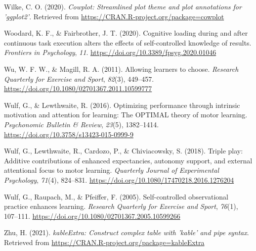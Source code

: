 \documentclass[
  english,
  doc, donotrepeattitle,floatsintext]{apa7}
\newlength{\cslhangindent}
\newlength{\cslentryspacingunit} %
\newenvironment{CSLReferences}[2] %
 {%
  \setlength{\parindent}{0pt}
  \ifodd #1
  \let\oldpar\par
  \def\par{\hangindent=\cslhangindent\oldpar}
  \fi
  \setlength{\parskip}{#2\cslentryspacingunit}
 }%
 {}
\begin{document}
\begin{CSLReferences}{1}{0}
\leavevmode{}%
Wilke, C. O. (2020). \emph{Cowplot: Streamlined plot theme and plot annotations for 'ggplot2'}. Retrieved from \url{https://CRAN.R-project.org/package=cowplot}

\leavevmode{}%
Woodard, K. F., \& Fairbrother, J. T. (2020). Cognitive loading during and after continuous task execution alters the effects of self-controlled knowledge of results. \emph{Frontiers in Psychology}, \emph{11}. \url{https://doi.org/10.3389/fpsyg.2020.01046}

\leavevmode{}%
Wu, W. F. W., \& Magill, R. A. (2011). Allowing learners to choose. \emph{Research Quarterly for Exercise and Sport}, \emph{82}(3), 449--457. \url{https://doi.org/10.1080/02701367.2011.10599777}

\leavevmode{}%
Wulf, G., \& Lewthwaite, R. (2016). Optimizing performance through intrinsic motivation and attention for learning: The OPTIMAL theory of motor learning. \emph{Psychonomic Bulletin \& Review}, \emph{23}(5), 1382--1414. \url{https://doi.org/10.3758/s13423-015-0999-9}

\leavevmode{}%
Wulf, G., Lewthwaite, R., Cardozo, P., \& Chiviacowsky, S. (2018). Triple play: Additive contributions of enhanced expectancies, autonomy support, and external attentional focus to motor learning. \emph{Quarterly Journal of Experimental Psychology}, \emph{71}(4), 824--831. \url{https://doi.org/10.1080/17470218.2016.1276204}

\leavevmode{}%
Wulf, G., Raupach, M., \& Pfeiffer, F. (2005). Self-controlled observational practice enhances learning. \emph{Research Quarterly for Exercise and Sport}, \emph{76}(1), 107--111. \url{https://doi.org/10.1080/02701367.2005.10599266}

\leavevmode{}%
Zhu, H. (2021). \emph{kableExtra: Construct complex table with 'kable' and pipe syntax}. Retrieved from \url{https://CRAN.R-project.org/package=kableExtra}

\end{CSLReferences}
\end{document}
